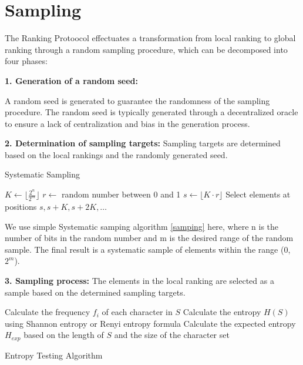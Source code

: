 \documentclass[twocolumn]{article}
\begin{document}
\section{Sampling}

The Ranking Protoocol effectuates a transformation from local ranking to global ranking through a random sampling procedure, which can be decomposed into four phases:

\textbf{1. Generation of a random seed:}

A random seed is generated to guarantee the randomness of the sampling procedure. The random seed is typically generated through a decentralized oracle to ensure a lack of centralization and bias in the generation process.

\textbf{2. Determination of sampling targets:} Sampling targets are determined based on the local rankings and the randomly generated seed.

\begin{algorithm}[htbp]
  \caption{Systematic Sampling}
  \label{samping}
\begin{algorithmic}[1]
\State $K \gets \lfloor \frac{2^n}{2^m} \rfloor$
\State $r \gets$ random number between 0 and 1
\State $s \gets \lfloor K \cdot r \rfloor$
\State Select elements at positions $s, s + K, s + 2K, \dots$
\end{algorithmic}
\end{algorithm}

We use simple Systematic samping algorithm \ref{samping} here, where n is the number of bits in the random number and m is the desired range of the random sample. The final result is a systematic sample of elements within the range (0, $2^m$).

\textbf{3. Sampling process:} The elements in the local ranking are selected as a sample based on the determined sampling targets.

\begin{algorithm}[htbp]
\begin{algorithmic}[1]
\State Calculate the frequency $f_i$ of each character in $S$
\State Calculate the entropy $H(S)$ using Shannon entropy or Renyi entropy formula
\State Calculate the expected entropy $H_{exp}$ based on the length of $S$ and the size of the character set
\State {}
\Else
\State {}
\EndIf
\end{algorithmic}
\label{entropy}
\caption{Entropy Testing Algorithm}
\end{algorithm}
\end{document}
